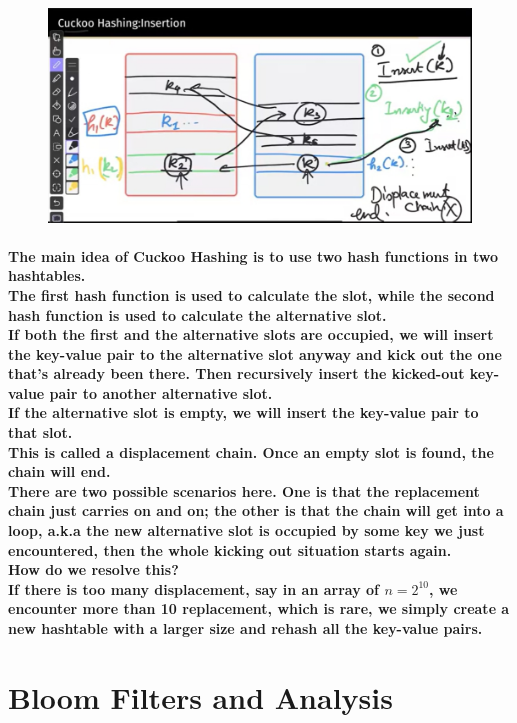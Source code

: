 \documentclass{article}
\begin{document}
\begin{figure}[H]
    \includegraphics[width=\textwidth]{cuckoohashing.png}
\end{figure}

\paragraph{The main idea of Cuckoo Hashing is to use two hash functions in two hashtables.\\
The first hash function is used to calculate the slot, while the second hash function is
used to calculate the alternative slot.\\
If both the first and the alternative slots are occupied, we will insert the key-value pair to the alternative slot anyway 
and kick out the one that's already been there. Then recursively insert the kicked-out key-value pair to another alternative slot.\\
If the alternative slot is empty, we will insert the key-value pair to that slot.\\
This is called a displacement chain. Once an empty slot is found, the chain will end.\\
There are two possible scenarios here. One is that the replacement chain just carries on and on;
the other is that the chain will get into a loop, a.k.a the new alternative slot is occupied by some key we just encountered,
then the whole kicking out situation starts again.\\
How do we resolve this?\\
If there is too many displacement, say in an array of $n=2^{10}$, we encounter more than 10 replacement, which is rare, we simply 
create a new hashtable with a larger size and rehash all the key-value pairs.\\}


\section{Bloom Filters and Analysis}
\end{document}
